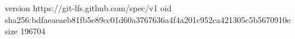 version https://git-lfs.github.com/spec/v1
oid sha256:bdfaeaeaeb81fb5e89cc01d60a3767636a4f4a201c952ca421305c5b5670910e
size 196704
